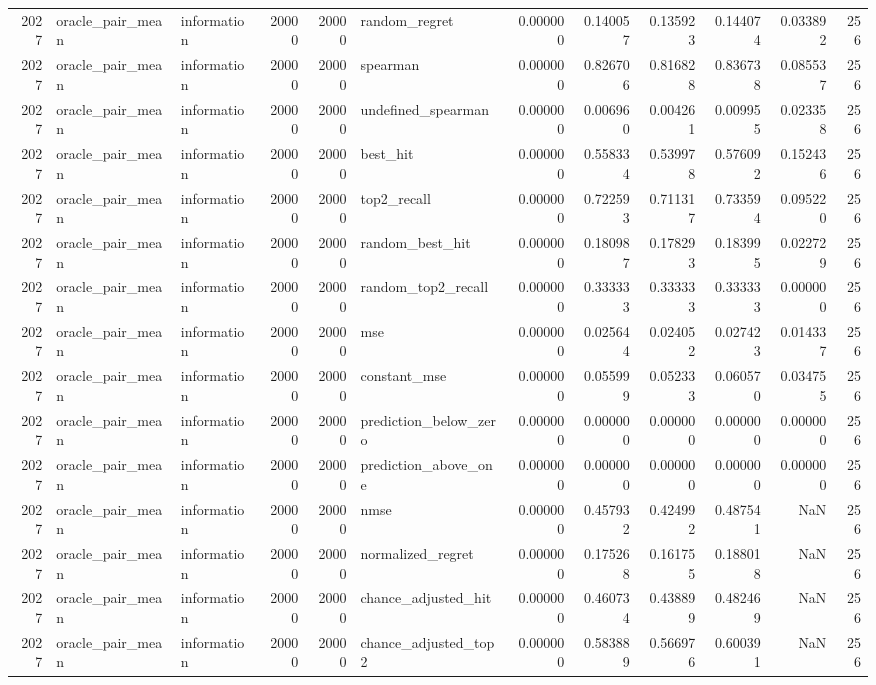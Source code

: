 \begin{tabular}{rllrrlrrrrrr}
2027 & oracle_pair_mean & information & 20000 & 20000 & random_regret & 0.000000 & 0.140057 & 0.135923 & 0.144074 & 0.033892 & 256 \\
2027 & oracle_pair_mean & information & 20000 & 20000 & spearman & 0.000000 & 0.826706 & 0.816828 & 0.836738 & 0.085537 & 256 \\
2027 & oracle_pair_mean & information & 20000 & 20000 & undefined_spearman & 0.000000 & 0.006960 & 0.004261 & 0.009955 & 0.023358 & 256 \\
2027 & oracle_pair_mean & information & 20000 & 20000 & best_hit & 0.000000 & 0.558334 & 0.539978 & 0.576092 & 0.152436 & 256 \\
2027 & oracle_pair_mean & information & 20000 & 20000 & top2_recall & 0.000000 & 0.722593 & 0.711317 & 0.733594 & 0.095220 & 256 \\
2027 & oracle_pair_mean & information & 20000 & 20000 & random_best_hit & 0.000000 & 0.180987 & 0.178293 & 0.183995 & 0.022729 & 256 \\
2027 & oracle_pair_mean & information & 20000 & 20000 & random_top2_recall & 0.000000 & 0.333333 & 0.333333 & 0.333333 & 0.000000 & 256 \\
2027 & oracle_pair_mean & information & 20000 & 20000 & mse & 0.000000 & 0.025644 & 0.024052 & 0.027423 & 0.014337 & 256 \\
2027 & oracle_pair_mean & information & 20000 & 20000 & constant_mse & 0.000000 & 0.055999 & 0.052333 & 0.060570 & 0.034755 & 256 \\
2027 & oracle_pair_mean & information & 20000 & 20000 & prediction_below_zero & 0.000000 & 0.000000 & 0.000000 & 0.000000 & 0.000000 & 256 \\
2027 & oracle_pair_mean & information & 20000 & 20000 & prediction_above_one & 0.000000 & 0.000000 & 0.000000 & 0.000000 & 0.000000 & 256 \\
2027 & oracle_pair_mean & information & 20000 & 20000 & nmse & 0.000000 & 0.457932 & 0.424992 & 0.487541 & NaN & 256 \\
2027 & oracle_pair_mean & information & 20000 & 20000 & normalized_regret & 0.000000 & 0.175268 & 0.161755 & 0.188018 & NaN & 256 \\
2027 & oracle_pair_mean & information & 20000 & 20000 & chance_adjusted_hit & 0.000000 & 0.460734 & 0.438899 & 0.482469 & NaN & 256 \\
2027 & oracle_pair_mean & information & 20000 & 20000 & chance_adjusted_top2 & 0.000000 & 0.583889 & 0.566976 & 0.600391 & NaN & 256 \\

\end{tabular}
